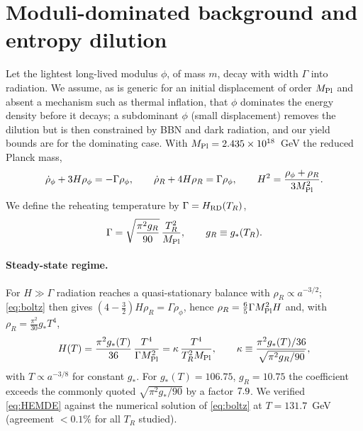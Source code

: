 \documentclass[11pt]{article}
\newcommand{\MP}{M_{\rm Pl}}
\begin{document}
\section{Moduli-dominated background and entropy dilution}\label{sec:bg}
Let the lightest long-lived modulus $\phi$, of mass $m$, decay with width $\Gamma$ into radiation. We assume, as is generic for an initial displacement of order $\MP$ and absent a mechanism such as thermal inflation, that $\phi$ dominates the energy density before it decays; a subdominant $\phi$ (small displacement) removes the dilution but is then constrained by BBN and dark radiation, and our yield bounds are for the dominating case. With $\MP=2.435\times10^{18}$~GeV the reduced Planck mass,
\begin{equation}
\dot\rho_\phi+3H\rho_\phi=-\Gamma\rho_\phi,\qquad
\dot\rho_R+4H\rho_R=\Gamma\rho_\phi,\qquad
H^2=\frac{\rho_\phi+\rho_R}{3\MP^2}.\label{eq:boltz}
\end{equation}
We define the reheating temperature by $\Gamma=H_{\rm RD}(T_R)$,
\begin{equation}
\Gamma=\sqrt{\frac{\pi^2g_R}{90}}\,\frac{T_R^2}{\MP},\qquad g_R\equiv g_*(T_R).\label{eq:TR}
\end{equation}
\paragraph{Steady-state regime.} For $H\gg\Gamma$ radiation reaches a quasi-stationary balance with $\rho_R\propto a^{-3/2}$; \eqref{eq:boltz} then gives $(4-\tfrac32)H\rho_R=\Gamma\rho_\phi$, hence $\rho_R=\tfrac65\Gamma\MP^2H$ and, with $\rho_R=\frac{\pi^2}{30}g_*T^4$,
\begin{equation}
H(T)=\frac{\pi^2g_*(T)}{36}\,\frac{T^4}{\Gamma\MP^2}=\kappa\,\frac{T^4}{T_R^2\MP},\qquad
\kappa\equiv\frac{\pi^2g_*(T)/36}{\sqrt{\pi^2g_R/90}},\label{eq:HEMDE}
\end{equation}
with $T\propto a^{-3/8}$ for constant $g_*$. For $g_*(T)=106.75$, $g_R=10.75$ the coefficient exceeds the commonly quoted $\sqrt{\pi^2g_*/90}$ by a factor $7.9$. We verified \eqref{eq:HEMDE} against the numerical solution of \eqref{eq:boltz} at $T=131.7$~GeV (agreement $<0.1\%$ for all $T_R$ studied).
\end{document}
